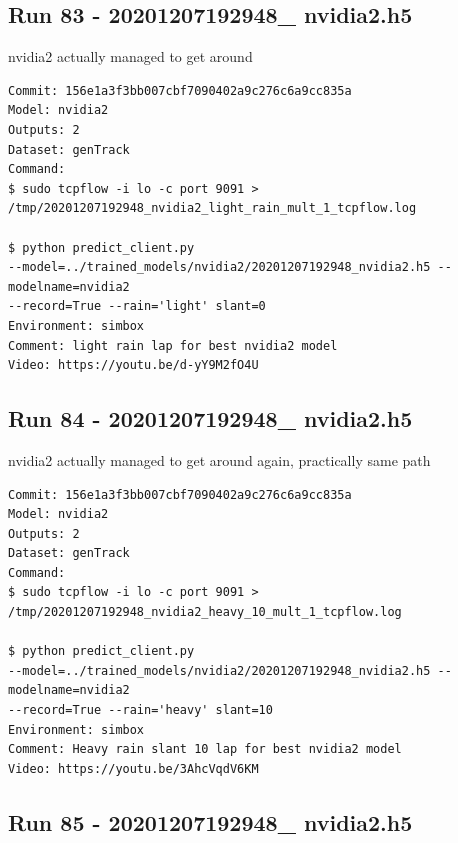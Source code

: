 \subsection{Run 83 - 20201207192948\_ nvidia2.h5 }
nvidia2 actually managed to get around
\label{app_res:83}
\begin{verbatim}
Commit: 156e1a3f3bb007cbf7090402a9c276c6a9cc835a
Model: nvidia2 
Outputs: 2
Dataset: genTrack
Command:
$ sudo tcpflow -i lo -c port 9091 > 
/tmp/20201207192948_nvidia2_light_rain_mult_1_tcpflow.log

$ python predict_client.py
--model=../trained_models/nvidia2/20201207192948_nvidia2.h5 --modelname=nvidia2 
--record=True --rain='light' slant=0
Environment: simbox
Comment: light rain lap for best nvidia2 model
Video: https://youtu.be/d-yY9M2fO4U
\end{verbatim}

\subsection{Run 84 - 20201207192948\_ nvidia2.h5 }
nvidia2 actually managed to get around again, practically same path
\label{app_res:84}
\begin{verbatim}
Commit: 156e1a3f3bb007cbf7090402a9c276c6a9cc835a
Model: nvidia2 
Outputs: 2
Dataset: genTrack
Command:
$ sudo tcpflow -i lo -c port 9091 > 
/tmp/20201207192948_nvidia2_heavy_10_mult_1_tcpflow.log

$ python predict_client.py
--model=../trained_models/nvidia2/20201207192948_nvidia2.h5 --modelname=nvidia2 
--record=True --rain='heavy' slant=10
Environment: simbox
Comment: Heavy rain slant 10 lap for best nvidia2 model
Video: https://youtu.be/3AhcVqdV6KM
\end{verbatim}

\subsection{Run 85 - 20201207192948\_ nvidia2.h5 }

